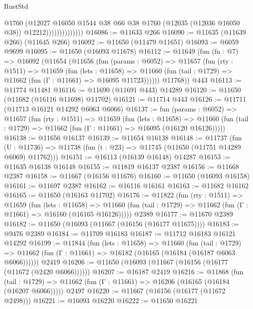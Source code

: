 \begin{lexlean}{RustStd}
\begin{coremodule}
                              @1760
                              (@12027
                                @16050
                                @1544
                                @38
                                @66
                                @38
                                @1760
                                (@12035 (@12036 @16050 @38))
                                @12212))))))))))))))
@16086 := @11633 @266
@16090 := @11635 (@11639 @266) (@11645 @266)
@16092 := @11650 (@11479 @11651)
@16093 := @6059 @9699
@16095 := @11650 (@16093 @11678)
@16112 := @11649
    (fun (fn : @7) =>
    @16092
      (@11654
        (@11656
          (fun (params : @6052) =>
          @11657
            (fun (rty : @1511) =>
            @11659
              (fun (lets : @11658) =>
              @11660 (fun (tail : @1729) => @11662 (fun (Γ : @11661) => @16095 @11723))))))
        @11768))
    @443
@16113 := @11774 @11481
@16116 := @11690 (@11691 @443) @14289
@16120 := @11650 (@11682 (@16116 @11698) @11702)
@16121 := @11714 @443
@16126 := @11711 (@11713 @16121 @14292 @6063 @6066)
@16137 := fun (params : @6052) =>
  @11657
    (fun (rty : @1511) =>
    @11659
      (fun (lets : @11658) =>
      @11660 (fun (tail : @1729) => @11662 (fun (Γ : @11661) => @16095 (@16120 @16126)))))
@16138 := @11656 @16137
@16139 := @11654 @16138
@16148 := @11737
    (fun (U : @11736) => @11738 (fun (t : @23) => @11745 (@11650 (@11751 @14289 @6069) @11762)))
@16151 := @16113 (@16139 @16148) @14287
@16153 := @11635 @16138 @16148
@16155 := @11819 @16137 @2387
@16156 := @11668 @2387
@16158 := @11667 (@16156 @11676)
@16160 := @11650 (@16093 @16158)
@16161 := @11697 @2387
@16162 := @16116 @16161
@16163 := @11682 @16162
@16165 := @11650 (@16163 @11702)
@16176 := @11822
    (fun (rty : @1511) =>
    @11659
      (fun (lets : @11658) =>
      @11660 (fun (tail : @1729) => @11662 (fun (Γ : @11661) => @16160 (@16165 @16126)))))
    @2389
@16177 := @11670 @2389
@16182 := @11650 (@16093 (@11667 (@16156 (@16177 @11675))))
@16183 := @9476 @2389
@16184 := @11709 @16183
@16187 := @11712 @16183 @16121 @14292
@16199 := @11844
    (fun (lets : @11658) =>
    @11660
      (fun (tail : @1729) =>
      @11662 (fun (Γ : @11661) => @16182 (@16165 (@16184 (@16187 @6063 @6066))))))
    @2419
@16206 := @11650 (@16093 (@11667 (@16156 (@16177 (@11672 (@2420 @6066))))))
@16207 := @16187 @2419
@16216 := @11868
    (fun (tail : @1729) => @11662 (fun (Γ : @11661) => @16206 (@16165 (@16184 (@16207 @6066)))))
    @2497
@16220 := @11667 (@16156 (@16177 (@11672 @2498)))
@16221 := @16093 @16220
@16222 := @11650 @16221

\end{coremodule}
\end{lexlean}
